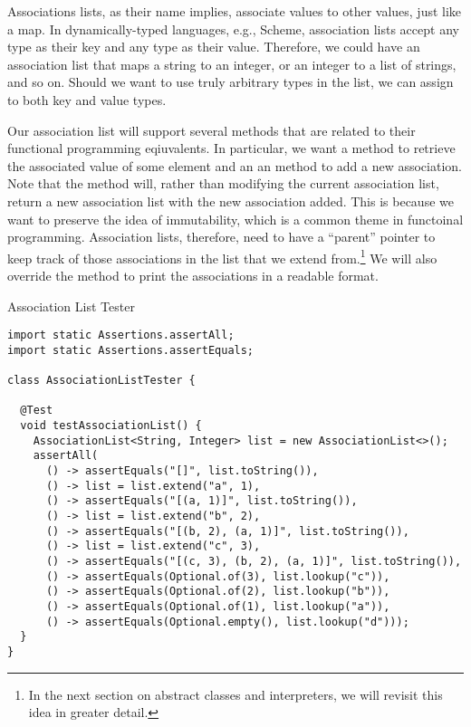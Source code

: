 
Associations lists, as their name implies, associate values to other values, just like a map. In dynamically-typed languages, e.g., Scheme, association lists accept any type as their key and any type as their value. Therefore, we could have an association list that maps a string to an integer, or an integer to a list of strings, and so on. Should we want to use truly arbitrary types in the list, we can assign  to both key and value types.

Our association list will support several methods that are related to their functional programming eqiuvalents. In particular, we want a  method to retrieve the associated value of some element and an an  method to add a new association. Note that the  method will, rather than modifying the current association list, return a new association list with the new association added. This is because we want to preserve the idea of immutability, which is a common theme in functoinal programming. Association lists, therefore, need to have a ``parent'' pointer to keep track of those associations in the list that we extend from.\footnote{In the next section on abstract classes and interpreters, we will revisit this idea in greater detail.} We will also override the  method to print the associations in a readable format. 

\begin{cl}[]{Association List Tester}
\begin{lstlisting}[language=MyJava]
import static Assertions.assertAll;
import static Assertions.assertEquals;

class AssociationListTester {

  @Test
  void testAssociationList() {
    AssociationList<String, Integer> list = new AssociationList<>();
    assertAll(
      () -> assertEquals("[]", list.toString()),
      () -> list = list.extend("a", 1),
      () -> assertEquals("[(a, 1)]", list.toString()),
      () -> list = list.extend("b", 2),
      () -> assertEquals("[(b, 2), (a, 1)]", list.toString()),
      () -> list = list.extend("c", 3),
      () -> assertEquals("[(c, 3), (b, 2), (a, 1)]", list.toString()),
      () -> assertEquals(Optional.of(3), list.lookup("c")),
      () -> assertEquals(Optional.of(2), list.lookup("b")),
      () -> assertEquals(Optional.of(1), list.lookup("a")),
      () -> assertEquals(Optional.empty(), list.lookup("d")));
  }
}
\end{lstlisting}
\end{cl}

